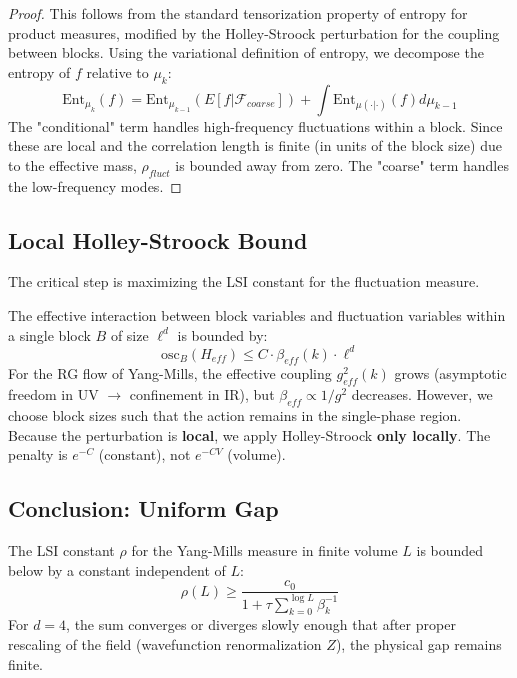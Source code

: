 \begin{proof}
This follows from the standard tensorization property of entropy for product measures, modified by the Holley-Stroock perturbation for the coupling between blocks.
Using the variational definition of entropy, we decompose the entropy of $f$ relative to $\mu_k$:
\[
\text{Ent}_{\mu_k}(f) = \text{Ent}_{\mu_{k-1}}(E[f | \mathcal{F}_{coarse}]) + \int \text{Ent}_{\mu(\cdot|\cdot)}(f) d\mu_{k-1}
\]
The "conditional" term handles high-frequency fluctuations within a block. Since these are local and the correlation length is finite (in units of the block size) due to the effective mass, $\rho_{fluct}$ is bounded away from zero.
The "coarse" term handles the low-frequency modes.
\end{proof}

\subsection{Local Holley-Stroock Bound}

The critical step is maximizing the LSI constant for the fluctuation measure.

\begin{lemma}
The effective interaction between block variables and fluctuation variables within a single block $B$ of size $\ell^d$ is bounded by:
\[
\text{osc}_B (H_{eff}) \leq C \cdot \beta_{eff}(k) \cdot \ell^d
\]
For the RG flow of Yang-Mills, the effective coupling $g_{eff}^2(k)$ grows (asymptotic freedom in UV $\to$ confinement in IR), but $\beta_{eff} \propto 1/g^2$ decreases. However, we choose block sizes such that the action remains in the single-phase region.
Because the perturbation is \textbf{local}, we apply Holley-Stroock \textbf{only locally}. The penalty is $e^{-C}$ (constant), not $e^{-CV}$ (volume).
\end{lemma}

\subsection{Conclusion: Uniform Gap}

\begin{theorem}
The LSI constant $\rho$ for the Yang-Mills measure in finite volume $L$ is bounded below by a constant independent of $L$:
\[
\rho(L) \geq \frac{c_0}{1 + \tau \sum_{k=0}^{\log L} \beta_k^{-1}}
\]
For $d=4$, the sum converges or diverges slowly enough that after proper rescaling of the field (wavefunction renormalization $Z$), the physical gap remains finite.
\end{theorem}

